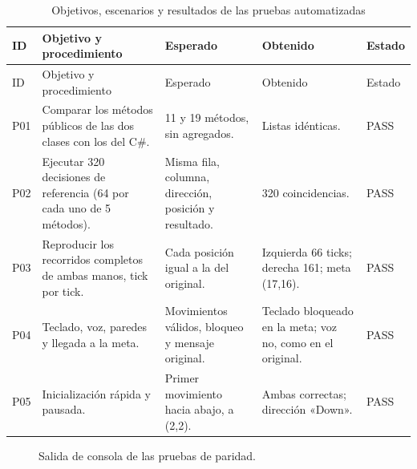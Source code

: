 \documentclass[12pt,a4paper]{article}
\begin{document}
\begin{longtable}{p{1cm}p{3.6cm}p{3.3cm}p{3.2cm}p{1.6cm}}
\caption{Objetivos, escenarios y resultados de las pruebas automatizadas}\\
\toprule ID & Objetivo y procedimiento & Esperado & Obtenido & Estado\\\midrule\endfirsthead
\toprule ID & Objetivo y procedimiento & Esperado & Obtenido & Estado\\\midrule\endhead
P01 & Comparar los métodos públicos de las dos clases con los del C\#. & 11 y 19 métodos, sin agregados. & Listas idénticas. & PASS\\
P02 & Ejecutar 320 decisiones de referencia (64 por cada uno de 5 métodos). & Misma fila, columna, dirección, posición y resultado. & 320 coincidencias. & PASS\\
P03 & Reproducir los recorridos completos de ambas manos, tick por tick. & Cada posición igual a la del original. & Izquierda 66 ticks; derecha 161; meta (17,16). & PASS\\
P04 & Teclado, voz, paredes y llegada a la meta. & Movimientos válidos, bloqueo y mensaje original. & Teclado bloqueado en la meta; voz no, como en el original. & PASS\\
P05 & Inicialización rápida y pausada. & Primer movimiento hacia abajo, a (2,2). & Ambas correctas; dirección «Down». & PASS\\
\bottomrule
\end{longtable}

\begin{figure}[H]

\caption{Salida de consola de las pruebas de paridad.}
\label{fig:consola-pruebas}
\end{figure}
\end{document}
